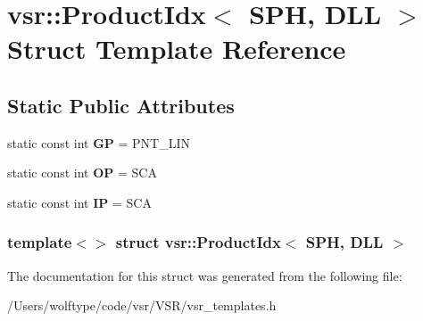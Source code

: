 \hypertarget{structvsr_1_1_product_idx_3_01_s_p_h_00_01_d_l_l_01_4}{\section{vsr\-:\-:Product\-Idx$<$ S\-P\-H, D\-L\-L $>$ Struct Template Reference}
\label{structvsr_1_1_product_idx_3_01_s_p_h_00_01_d_l_l_01_4}
}
\subsection*{Static Public Attributes}
\begin{DoxyCompactItemize}
\item 
\hypertarget{structvsr_1_1_product_idx_3_01_s_p_h_00_01_d_l_l_01_4_a029df308d6d975484c6e6e947c8262c4}{static const int {\bfseries G\-P} = P\-N\-T\-\_\-\-L\-I\-N}\label{structvsr_1_1_product_idx_3_01_s_p_h_00_01_d_l_l_01_4_a029df308d6d975484c6e6e947c8262c4}

\item 
\hypertarget{structvsr_1_1_product_idx_3_01_s_p_h_00_01_d_l_l_01_4_ace2cb4c48bbc46b3514e1016be2d2eaf}{static const int {\bfseries O\-P} = S\-C\-A}\label{structvsr_1_1_product_idx_3_01_s_p_h_00_01_d_l_l_01_4_ace2cb4c48bbc46b3514e1016be2d2eaf}

\item 
\hypertarget{structvsr_1_1_product_idx_3_01_s_p_h_00_01_d_l_l_01_4_a2f3c1d2dac6daca6fd943903d74adfb1}{static const int {\bfseries I\-P} = S\-C\-A}\label{structvsr_1_1_product_idx_3_01_s_p_h_00_01_d_l_l_01_4_a2f3c1d2dac6daca6fd943903d74adfb1}

\end{DoxyCompactItemize}
\subsubsection*{template$<$$>$ struct vsr\-::\-Product\-Idx$<$ S\-P\-H, D\-L\-L $>$}



The documentation for this struct was generated from the following file\-:\begin{DoxyCompactItemize}
\item 
/\-Users/wolftype/code/vsr/\-V\-S\-R/vsr\-\_\-templates.\-h\end{DoxyCompactItemize}
